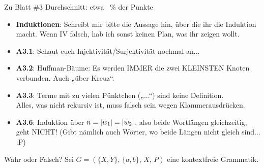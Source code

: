 



\graphicspath{{../figures/}}

\morescalingdelimiters





\begin{frame}{Zu Blatt \#3}
	Durchschnitt: \quad etwa ~\% der Punkte \\
	\begin{itemize}
		\item \textbf{Induktionen}: Schreibt mir bitte die Aussage hin, über die ihr die Induktion macht. Wenn IV falsch, hab ich sonst keinen Plan, was ihr zeigen wollt.
		\item \textbf{A3.1}: Schaut euch Injektivität/Surjektivität nochmal an...
		\item \textbf{A3.2}: Huffman-Bäume: Es werden IMMER die zwei KLEINSTEN Knoten verbunden. Auch „über Kreuz“. 
		\item \textbf{A3.3}: Terme mit zu vielen Pünktchen („...“) sind keine Definition. \\ Alles, was nicht rekursiv ist, muss falsch sein wegen Klammerausdrücken.
		\item \textbf{A3.6}: Induktion über $n = \left\lvert w_1 \right\rvert = \left\lvert w_2 \right\rvert$, also beide Wortlängen gleichzeitig, geht NICHT! (Gibt nämlich auch Wörter, wo beide Längen nicht gleich sind... :P)
		
	\end{itemize}
\end{frame}

\framePrevEpisode

\begin{frame}[t]{Wahr oder Falsch?}
	\thasse{\Socrative}
	Sei $G=(\{X,Y\},\, \{a,b\},\, X,\, P)$ eine kontextfreie Grammatik. \\
\end{frame}

